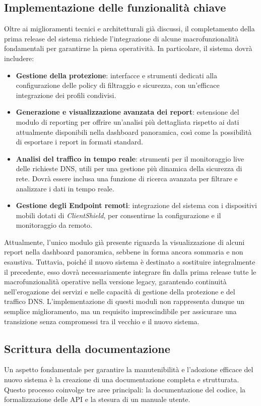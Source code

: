 \subsection{Implementazione delle funzionalità chiave}
Oltre ai miglioramenti tecnici e architetturali già discussi, il completamento della prima release del sistema richiede l’integrazione di alcune macrofunzionalità fondamentali per garantirne la piena operatività. In particolare, il sistema dovrà includere:
\begin{itemize}
  \item \textbf{Gestione della protezione}: interfacce e strumenti dedicati alla configurazione delle policy di filtraggio e sicurezza, con un'efficace integrazione dei profili condivisi.
  \item \textbf{Generazione e visualizzazione avanzata dei report}: estensione del modulo di reporting per offrire un’analisi più dettagliata rispetto ai dati attualmente disponibili nella dashboard panoramica, così come la possibilità di esportare i report in formati standard.
  \item \textbf{Analisi del traffico in tempo reale}: strumenti per il monitoraggio live delle richieste DNS, utili per una gestione più dinamica della sicurezza di rete. Dovrà essere inclusa una funzione di ricerca avanzata per filtrare e analizzare i dati in tempo reale.
  \item \textbf{Gestione degli Endpoint remoti}: integrazione del sistema con i dispositivi mobili dotati di \textit{ClientShield}, per consentirne la configurazione e il monitoraggio da remoto.
\end{itemize}

Attualmente, l’unico modulo già presente riguarda la visualizzazione di alcuni report nella dashboard panoramica, sebbene in forma ancora sommaria e non esaustiva. Tuttavia, poiché il nuovo sistema è destinato a sostituire integralmente il precedente, esso dovrà necessariamente integrare fin dalla prima release tutte le macrofunzionalità operative nella versione legacy, garantendo continuità nell’erogazione dei servizi e nelle capacità di gestione della protezione e del traffico DNS. L’implementazione di questi moduli non rappresenta dunque un semplice miglioramento, ma un requisito imprescindibile per assicurare una transizione senza compromessi tra il vecchio e il nuovo sistema.

\subsection{Scrittura della documentazione}
Un aspetto fondamentale per garantire la manutenibilità e l’adozione efficace del nuovo sistema è la creazione di una documentazione completa e strutturata. Questo processo coinvolge tre aree principali: la documentazione del codice, la formalizzazione delle API e la stesura di un manuale utente.

